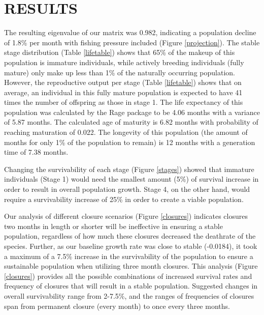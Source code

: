 \documentclass[
]{article}
\begin{document}
\hypertarget{results}{%
\section{RESULTS}\label{results}}

The resulting eigenvalue of our matrix was 0.982, indicating a population decline of 1.8\% per month with fishing pressure included (Figure \ref{projection}). The stable stage distribution (Table \ref{lifetable}) shows that 65\% of the makeup of this population is immature individuals, while actively breeding individuals (fully mature) only make up less than 1\% of the naturally occurring population. However, the reproductive output per stage (Table \ref{lifetable}) shows that on average, an individual in this fully mature population is expected to have 41 times the number of offspring as those in stage 1. The life expectancy of this population was calculated by the Rage package to be 4.06 months with a variance of 5.87 months. The calculated age of maturity is 6.82 months with probability of reaching maturation of 0.022. The longevity of this population (the amount of months for only 1\% of the population to remain) is 12 months with a generation time of 7.38 months.

Changing the survivability of each stage (Figure \ref{stages}) showed that immature individuals (Stage 1) would need the smallest amount (5\%) of survival increase in order to result in overall population growth. Stage 4, on the other hand, would require a survivability increase of 25\% in order to create a viable population.

Our analysis of different closure scenarios (Figure \ref{closures}) indicates closures two months in length or shorter will be ineffective in ensuring a stable population, regardless of how much these closures decreased the deathrate of the species. Further, as our baseline growth rate was close to stable (-0.0184), it took a maximum of a 7.5\% increase in the survivability of the population to ensure a sustainable population when utilizing three month closures. This analysis (Figure \ref{closures}) provides all the possible combinations of increased survival rates and frequency of closures that will result in a stable population. Suggested changes in overall survivability range from 2-7.5\%, and the ranges of frequencies of closures span from permanent closure (every month) to once every three months.
\end{document}
